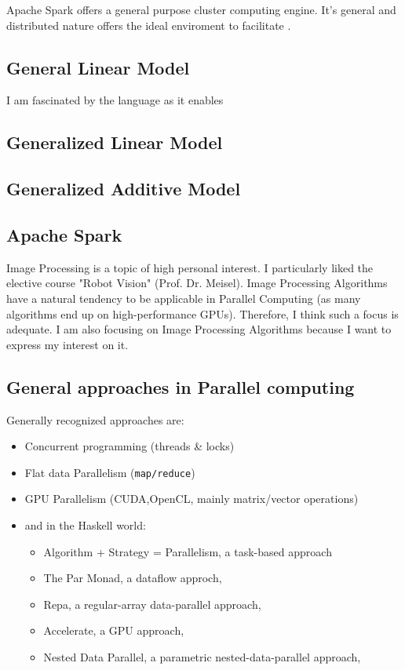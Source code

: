 \documentclass{article}
\begin{document}
    Apache Spark offers a general purpose cluster computing engine. It's general and distributed nature offers the ideal enviroment to facilitate .

    \subsection{General Linear Model}
    I am fascinated by the language as it enables

    \subsection{Generalized Linear Model}

    \subsection{Generalized Additive Model}

    \subsection{Apache Spark}
    Image Processing is a topic of high personal interest.
    I particularly liked the elective course "Robot Vision" (Prof. Dr. Meisel).
    Image Processing Algorithms have a natural tendency to be applicable in Parallel Computing (as many algorithms end up on high-performance GPUs).
    Therefore, I think such a focus is adequate.
    I am also focusing on Image Processing Algorithms because I want to express my interest on it.

    \subsection{General approaches in Parallel computing}
    Generally recognized approaches are:
    \begin{itemize}
        \item Concurrent programming (threads \& locks)
        \item Flat data Parallelism (\texttt{map/reduce})
        \item GPU Parallelism (CUDA,OpenCL, mainly matrix/vector operations)
        \item and in the Haskell world: \cite{Marlow2012Parallel}
        \begin{itemize}
            \item Algorithm + Strategy = Parallelism, a task-based approach \cite{Trinder1998Algorithm}
            \item The Par Monad, a dataflow approch, \cite{Marlow2011Monad}
            \item Repa, a regular-array data-parallel approach, \cite{Keller2010Regular}
            \item Accelerate, a GPU approach, \cite{McDonell2013Optimising}
            \item Nested Data Parallel, a parametric nested-data-parallel approach, \cite{Chakravarty2007Data}
        \end{itemize}
    \end{itemize}
\end{document}
